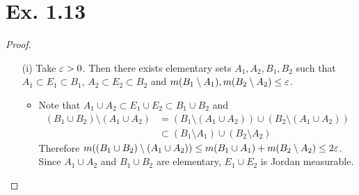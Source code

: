 \documentclass[hw_all.tex]{subfiles}
\begin{document}
\section*{Ex. 1.13}

\begin{proof}
    \begin{enumerate}
        \item[(i)] Take $\varepsilon > 0$. Then there exists elementary sets $A_1, A_2, B_1, B_2$ such that $A_1 \subset E_1 \subset B_1$, $A_2 \subset E_2 \subset B_2$ and $m(B_1 \setminus A_1), m(B_2 \setminus A_2) \leq \varepsilon$. 
            \begin{itemize}
                \item Note that $A_1 \cup A_2 \subset E_1 \cup E_2 \subset B_1 \cup B_2$ and
                    \begin{align*}
                        (B_1 \cup B_2) \setminus (A_1 \cup A_2) &= (B_1 \setminus (A_1 \cup A_2)) \cup (B_2 \setminus (A_1 \cup A_2)) \\
                                                                &\subset (B_1 \setminus A_1) \cup (B_2 \setminus A_2)
                    \end{align*}
                    Therefore $m((B_1 \cup B_2) \setminus (A_1 \cup A_2)) \leq m(B_1 \cup A_1) + m(B_2 \setminus A_2) \leq 2 \varepsilon$. Since $A_1 \cup A_2$ and $B_1 \cup B_2$ are elementary, $E_1 \cup E_2$ is Jordan measurable.


\end{itemize}
\end{enumerate}
\end{proof}
\end{document}
